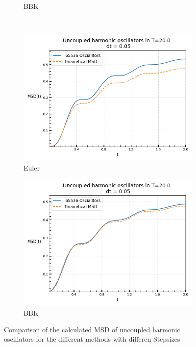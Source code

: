 \begin{figure}[htp]
\begin{subfigure}{0.5\textwidth}
			\caption{BBK}
		\end{subfigure}  \\
		\begin{subfigure}{0.5\textwidth}
			\centering
			\includegraphics[width=0.8\linewidth]{graphics/MSD-Euler-0.05.png}
			\caption{Euler}
		\end{subfigure}
		\begin{subfigure}{0.5\textwidth}
			\centering
			\includegraphics[width=0.8\linewidth]{graphics/MSD-BBK-0.05.png}
			\caption{BBK}
		\end{subfigure}
		\label{MSD-Comparison}
		\caption{Comparison of the calculated MSD of uncoupled harmonic oscillators for the different methods with differen Stepsizes}
	\end{figure}
	
